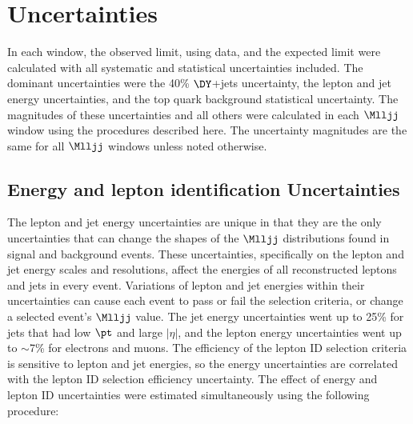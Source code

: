 \clearpage

\section{Uncertainties}
\label{sec:uncertainties}
In each window, the observed limit, using data, and the expected limit were calculated with all systematic and statistical 
uncertainties included.  The dominant uncertainties were the 40\% $\DY$+jets uncertainty, the lepton and jet energy 
uncertainties, and the top quark background statistical uncertainty.  The magnitudes of these uncertainties and all 
others were calculated in each $\Mlljj$ window using the procedures described here.  The uncertainty magnitudes are the same 
for all $\Mlljj$ windows unless noted otherwise.

\subsection{Energy and lepton identification Uncertainties}
\label{sec:enrgyLeptIdUncs}
The lepton and jet energy uncertainties are unique in that they are the only uncertainties that can change the shapes of 
the $\Mlljj$ distributions found in signal and background events.  These uncertainties, specifically on the lepton and 
jet energy scales and resolutions, affect the energies of all reconstructed leptons and jets in every event.  Variations 
of lepton and jet energies within their uncertainties can cause each event to pass or fail the selection criteria, or 
change a selected event's $\Mlljj$ value.  The jet energy uncertainties went up to 25\% for jets that had low $\pt$ and 
large $|\eta|$, and the lepton energy uncertainties went up to $\sim$7\% for electrons and muons.  The efficiency of the 
lepton ID selection criteria is sensitive to lepton and jet energies, so the energy uncertainties are correlated with the 
lepton ID selection efficiency uncertainty.  The effect of energy and lepton ID uncertainties were estimated simultaneously 
using the following procedure:


